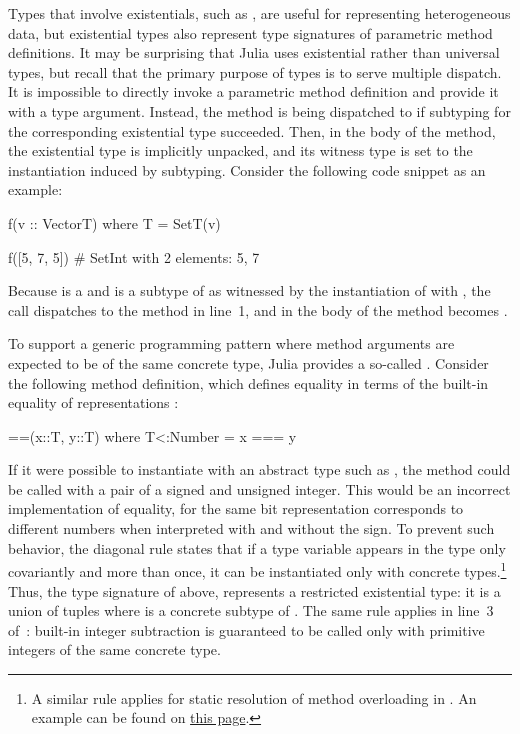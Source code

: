 Types that involve existentials, such as ,
are useful for representing heterogeneous data, but existential types
also represent type signatures of parametric method definitions.
It may be surprising that Julia uses existential rather than universal types,
but recall that the primary purpose of types is to serve multiple dispatch.
It is impossible to directly invoke a parametric method definition and provide
it with a type argument. Instead, the method is being dispatched to if
subtyping for the corresponding existential type succeeded. Then, in the body of
the method, the existential type is implicitly unpacked, and its witness type
is set to the instantiation induced by subtyping.
Consider the following code snippet as an example:
\begin{codeenvd}
\begin{julia}
f(v :: Vector{T}) where T = Set{T}(v)

f([5, 7, 5]) # Set{Int} with 2 elements: 5, 7
\end{julia}
\end{codeenvd}
Because \cjl{[5, 7, 5]} is a  and
 is a subtype of 
as witnessed by the instantiation of  with ,
the call  dispatches to the method in line~1,
and  in the body of the method becomes .

To support a generic programming pattern where method arguments are expected
to be of the same concrete type, Julia provides a so-called . Consider the following method definition, which defines equality
\cjl{(==)} in terms of the built-in equality of representations \cjl{(===)}:
\begin{codeenvd}
\begin{julia}
==(x::T, y::T) where T<:Number = x === y
\end{julia}
\end{codeenvd}
If it were possible to instantiate  with an abstract type such as
, the method could be called with a pair of a signed and unsigned
integer. This would be an incorrect implementation of equality, for the same bit
representation corresponds to different numbers when interpreted with and
without the sign.
To prevent such behavior, the diagonal rule states that if a type variable
appears in the type only covariantly and more than once, it can be instantiated
only with concrete types.\footnote{A similar rule applies for static resolution
of method overloading in \CSharp. An example can be found on
\href{https://fzn.fr/projects/lambdajulia/diagonalcsharp.pdf}{this page}.}
Thus, the type signature of \cjl{(==)} above,
 represents a restricted existential type:
it is a union of tuples  where  is a concrete subtype
of . The same rule applies in line~3
of~: built-in integer subtraction  is
guaranteed to be called only with primitive integers of the same concrete type.

